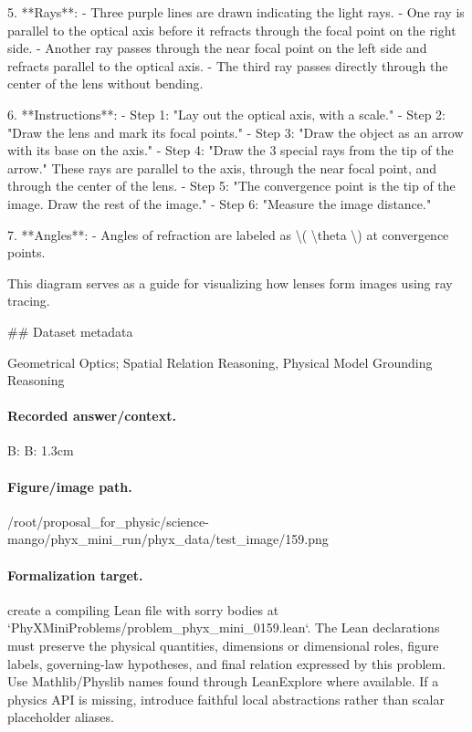 5. **Rays**:
   - Three purple lines are drawn indicating the light rays.
     - One ray is parallel to the optical axis before it refracts through the focal point on the right side.
     - Another ray passes through the near focal point on the left side and refracts parallel to the optical axis.
     - The third ray passes directly through the center of the lens without bending.

6. **Instructions**:
   - Step 1: "Lay out the optical axis, with a scale."
   - Step 2: "Draw the lens and mark its focal points."
   - Step 3: "Draw the object as an arrow with its base on the axis."
   - Step 4: "Draw the 3 special rays from the tip of the arrow." These rays are parallel to the axis, through the near focal point, and through the center of the lens.
   - Step 5: "The convergence point is the tip of the image. Draw the rest of the image."
   - Step 6: "Measure the image distance."

7. **Angles**:
   - Angles of refraction are labeled as \textbackslash{}( \textbackslash{}theta \textbackslash{}) at convergence points.

This diagram serves as a guide for visualizing how lenses form images using ray tracing.

\#\# Dataset metadata

Geometrical Optics; Spatial Relation Reasoning, Physical Model Grounding Reasoning

\paragraph{Recorded answer/context.}
B: B: 1.3cm

\paragraph{Figure/image path.}
/root/proposal\_for\_physic/science-mango/phyx\_mini\_run/phyx\_data/test\_image/159.png

\paragraph{Formalization target.}
create a compiling Lean file with sorry bodies at `PhyXMiniProblems/problem\_phyx\_mini\_0159.lean`. The Lean declarations must preserve the physical quantities, dimensions or dimensional roles, figure labels, governing-law hypotheses, and final relation expressed by this problem.
Use Mathlib/Physlib names found through LeanExplore where available. If a physics API is missing, introduce faithful local abstractions rather than scalar placeholder aliases.

